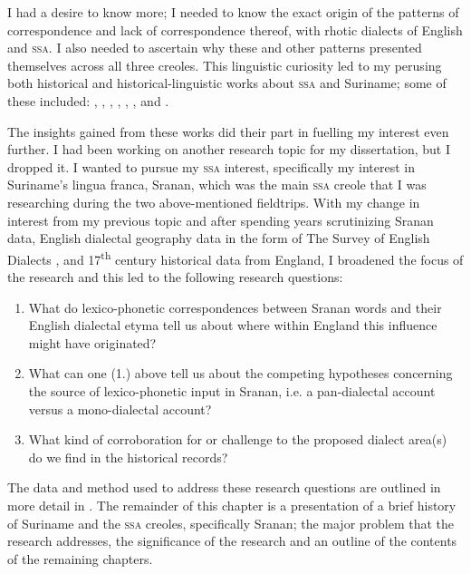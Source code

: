 I had a desire to know more; I needed to know the exact origin of the patterns of correspondence and lack of correspondence thereof, with rhotic dialects of English and \textsc{ssa}. I also needed to ascertain why these and other patterns presented themselves across all three creoles. This linguistic curiosity led to my perusing both historical and historical-linguistic works about \textsc{ssa}  and Suriname; some of these included: \citet{Bridenbaugh68},  \citet{Esposito82},   \citet{Hoefte98}, \citet{Kambel99},  \citet{Rens53},  \citet{Muysken86},  \citet{Smith87} and   \citet{Smith01}.

The insights gained from these works did their part in fuelling my interest even further. I had been working on another research topic for my dissertation, but I dropped it. I wanted to pursue my \textsc{ssa}  interest, specifically my interest in Suriname's lingua franca, Sranan, which was the main \textsc{ssa}  creole that I was researching during the two above-mentioned fieldtrips. With my change in interest from my previous topic and after spending years scrutinizing Sranan data, English dialectal geography data in the form of The Survey of English Dialects  \citep{Orton6271}, and 17\textsuperscript{th} century historical data from England, I broadened the focus of the research and this led to the following research questions:

\begin{enumerate}
\item What do lexico-phonetic correspondences between Sranan words and their English dialectal etyma tell us about where within England this influence might have originated?
\item What can one (1.) above tell us about the competing hypotheses concerning the source of lexico-phonetic input in Sranan, i.e. a pan-dialectal account versus a mono-dialectal account?
\item What kind of corroboration for or challenge to the proposed dialect area(s) do we find in the historical records?
\end{enumerate}

The data and method used to address these research questions are outlined in more detail in . The remainder of this chapter is a presentation of a brief history of Suriname and the \textsc{ssa}  creoles, specifically Sranan; the major problem that the research addresses, the significance of the research and an outline of the contents of the remaining chapters.

